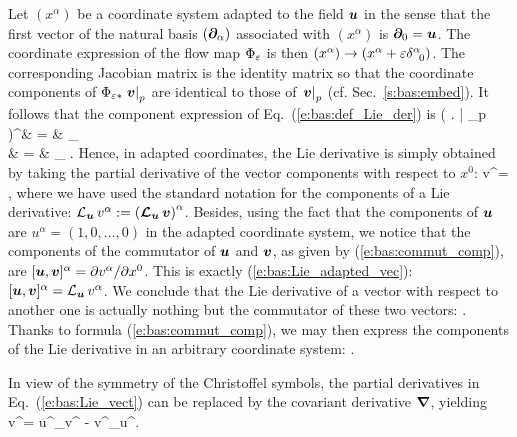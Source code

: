 Let $(x^\alpha)$ be a coordinate system adapted to the
field $\bm{u}$ in the sense that the first
vector of the natural basis $(\bm{\partial}_\alpha)$ associated with $(x^\alpha)$
is $\bm{\partial}_0 = \bm{u}$. The coordinate
expression of the flow map $\Phi_\varepsilon$ is then $(x^\alpha) \to (x^\alpha + \varepsilon \delta^\alpha_{\ \,  0})$.
The corresponding Jacobian matrix is the identity matrix so that the coordinate components of
$\Phi_{\varepsilon*} \left. \bm{v} \right| _p$ are identical to those of $\left. \bm{v} \right| _p$
(cf. Sec.~\ref{s:bas:embed}). It follows that the component expression of Eq.~(\ref{e:bas:def_Lie_der})
is
\bea
     \left(  \left.   \right| _p \right)^\alpha & = &
   \lim_{\veps{}} 
     \nonumber \\
   &  = & \lim_{\veps{}} 
     . \nonumber
\eea
Hence, in adapted coordinates, the Lie derivative is simply obtained by taking the partial derivative of the vector components with respect to $x^0$:
\be \label{e:bas:Lie_adapted_vec}
     v^\alpha  =  ,
\ee
where we have used the standard notation for the components of a Lie derivative:
${\mathcal{L}}_{\bm{u}}\, v^\alpha := \left( \bm{\mathcal{L}}_{\bm{u}}\, \bm{v} \right)^\alpha$.
Besides, using the fact that the components of $\bm{u}$
are $u^\alpha=(1,0,\ldots,0)$ in the adapted coordinate system, we notice that the components
of the commutator of $\bm{u}$ and $\bm{v}$, as given by (\ref{e:bas:commut_comp}), are
$[\bm{u},\bm{v}]^\alpha = {\partial v^\alpha}/{\partial x^0}$.
This is exactly (\ref{e:bas:Lie_adapted_vec}): $[\bm{u},\bm{v}]^\alpha = {\mathcal{L}}_{\bm{u}}\, v^\alpha$. We conclude that the Lie derivative of a vector with respect to another
one is actually nothing but the commutator of these two vectors:
\be \label{e:bas:Lie_commut}
     .
\ee
Thanks to formula (\ref{e:bas:commut_comp}), we may then express the components of the Lie
derivative in an arbitrary coordinate system:
\be \label{e:bas:Lie_vect}
     .
\ee

In view of the symmetry of the Christoffel symbols,
the partial derivatives in Eq.~(\ref{e:bas:Lie_vect}) can be
replaced by the covariant derivative $\bm{\nabla}$, yielding
\be \label{e:bas:Lie_vect_nab}
   v^\alpha = u^\mu \nabla_\mu v^\alpha
    - v^\mu \nabla_\mu u^\alpha .
\ee

